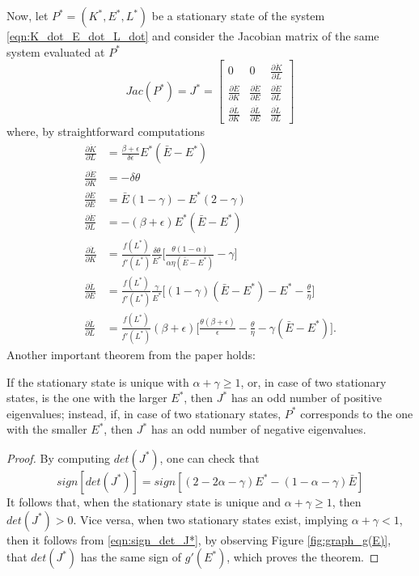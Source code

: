 Now, let $P^*=(K^*,E^*,L^*)$ be a stationary state of the system \eqref{eqn:K_dot_E_dot_L_dot} and consider the Jacobian matrix of the same system evaluated at $P^*$
$$
Jac(P^*)=J^* =
\begin{bmatrix}
	0 & 
	0 & 
	\frac{\partial\dot{K}}{\partial L} \\[1ex] %
	\frac{\partial\dot{E}}{\partial K} & 
	\frac{\partial\dot{E}}{\partial E} & 
	\frac{\partial\dot{E}}{\partial L} \\[1ex]
	\frac{\partial\dot{L}}{\partial K} & 
	\frac{\partial\dot{L}}{\partial E} & 
	\frac{\partial\dot{L}}{\partial L}
\end{bmatrix}
$$
where, by straightforward computations
\begin{equation} \label{eqn:part_deriv_Kdot_Ldot_Edot}
	\begin{split}
		\frac{\partial\dot{K}}{\partial L} &= \frac{\beta+\epsilon}{\delta\epsilon}E^*(\bar{E}-E^*)\\
		\frac{\partial\dot{E}}{\partial K} &=-\delta\theta \\
		\frac{\partial\dot{E}}{\partial E} &=\bar{E}(1-\gamma)-E^*(2-\gamma)\\
		\frac{\partial\dot{E}}{\partial L} &=-(\beta+\epsilon)E^*(\bar{E}-E^*)\\
		\frac{\partial\dot{L}}{\partial K} &=\frac{f(L^*)}{f'(L^*)}\frac{\delta\theta}{E^*} \Bigg[\frac{\theta(1-\alpha)}{\alpha\eta(\bar{E}-E^*)}-\gamma\Bigg]\\
		\frac{\partial\dot{L}}{\partial E} &=\frac{f(L^*)}{f'(L^*)}\frac{\gamma}{E^*} \Bigg[ (1-\gamma)(\bar{E}-E^*)-E^*-\frac{\theta}{\eta} \Bigg]\\
		\frac{\partial\dot{L}}{\partial L} &=\frac{f(L^*)}{f'(L^*)}(\beta+\epsilon) \Bigg[ \frac{\theta(\beta+\epsilon)}{\epsilon}-\frac{\theta}{\eta}-\gamma(\bar{E}-E^*) \Bigg].
	\end{split}
\end{equation}
Another important theorem from the paper holds: 
\begin{thm} \label{thm:num_eigenval_from_Jac}
	If the stationary state is unique with $\alpha+\gamma\geq1$, or, in case of two stationary states, is the one with the larger $E^*$, then $J^*$ has an odd number of positive eigenvalues; instead, if, in case of two stationary states, $P^*$ corresponds to the one with the smaller $E^*$, then $J^*$ has an odd number of negative eigenvalues.
\end{thm}
\begin{proof}
	By computing $det(J^*)$, one can check that
	\begin{equation} \label{eqn:sign_det_J*}
		sign[det(J^*)] = sign[(2-2\alpha-\gamma)E^*-(1-\alpha-\gamma)\bar{E}]
	\end{equation}
	It follows that, when the stationary state is unique and $\alpha+\gamma\geq1$, then $det(J^*) > 0$. Vice versa, when two stationary states exist, implying $\alpha+\gamma<1$, then it follows from \eqref{eqn:sign_det_J*}, by observing Figure \ref{fig:graph_g(E)}, that $det(J^*)$ has the same sign of $g'(E^*)$, which proves the theorem. 
\end{proof}

